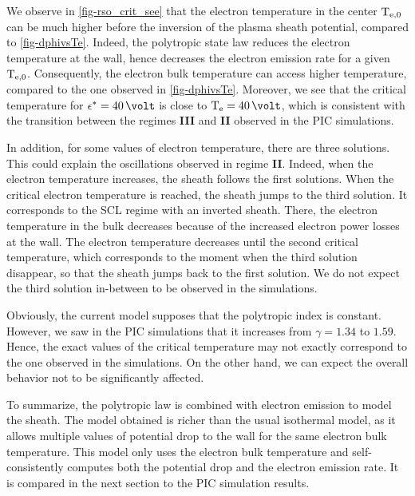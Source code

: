 We observe in \cref{fig-rso_crit_see} that the electron temperature in the center $\mathrm{T_{e, 0}}$ can be much higher before the inversion of the plasma sheath potential, compared to \cref{fig-dphivsTe}.
Indeed, the polytropic state law reduces the electron temperature at the wall, hence decreases the electron emission rate for a given $\mathrm{T_{e, 0}}$.
Consequently, the electron bulk temperature can access higher temperature, compared to the one observed in \cref{fig-dphivsTe}.
Moreover, we see that the critical temperature for $\crover=40 \,\volt$ is close to $\Te=40\,\volt$, which is consistent with the transition between the regimes {\bf III} and {\bf II} observed in the \ac{PIC} simulations.

In addition, for some values of electron temperature, there are three solutions.
This could explain the oscillations observed in regime {\bf II}.
Indeed, when the electron temperature increases, the sheath follows the first solutions.
When the critical electron temperature is reached, the sheath jumps to the third solution.
It corresponds to the \ac{SCL} regime with an inverted sheath.
There, the electron temperature in the bulk decreases because of the increased electron power losses at the wall.
The electron temperature decreases until the second critical temperature, which corresponds to the moment when the third solution disappear, so that the sheath jumps back to the first solution.
We do not expect the third solution in-between to be observed in the simulations.

Obviously, the current model supposes that the polytropic index is constant.
However, we saw in the \ac{PIC} simulations that it increases from $\gamma = 1.34$ to $1.59$.
Hence, the exact values of the critical temperature may not exactly correspond to the one observed in the simulations.
On the other hand, we can expect the overall behavior not to be significantly affected.

\vspace{1em}
To summarize, the polytropic law is combined with electron emission to model the sheath.
The model obtained is richer than the usual isothermal model, as it allows multiple values of potential drop to the wall for the same electron bulk temperature.
This model only uses the electron bulk temperature and self-consistently computes both the potential drop and the electron emission rate.
It is compared in the next section to the \ac{PIC} simulation results.


\let\rightmark=\oldrightmark
